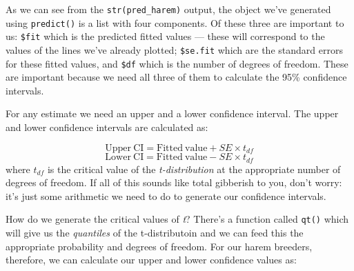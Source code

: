 \documentclass[
]{book}
\newenvironment{Shaded}{\begin{snugshade}}{\end{snugshade}}
\newcommand{\CommentTok}[1]{\textcolor[rgb]{0.56,0.35,0.01}{\textit{#1}}}
\newcommand{\DataTypeTok}[1]{\textcolor[rgb]{0.13,0.29,0.53}{#1}}
\newcommand{\FloatTok}[1]{\textcolor[rgb]{0.00,0.00,0.81}{#1}}
\newcommand{\KeywordTok}[1]{\textcolor[rgb]{0.13,0.29,0.53}{\textbf{#1}}}
\newcommand{\NormalTok}[1]{#1}
\newcommand{\OperatorTok}[1]{\textcolor[rgb]{0.81,0.36,0.00}{\textbf{#1}}}
\newcommand{\StringTok}[1]{\textcolor[rgb]{0.31,0.60,0.02}{#1}}
\begin{document}
As we can see from the \texttt{str(pred\_harem)} output, the object we've generated using \texttt{predict()} is a list with four components. Of these three are important to us: \texttt{\$fit} which is the predicted fitted values --- these will correspond to the values of the lines we've already plotted; \texttt{\$se.fit} which are the standard errors for these fitted values, and \texttt{\$df} which is the number of degrees of freedom. These are important because we need all three of them to calculate the 95\% confidence intervals.

For any estimate we need an upper and a lower confidence interval. The upper and lower confidence intervals are calculated as:

\[ \mathrm{Upper \: CI} = \mathrm{Fitted \: value} + SE \times t_{df} \]
\[ \mathrm{Lower \: CI} = \mathrm{Fitted \: value} - SE \times t_{df} \]
where \(t_{df}\) is the critical value of the \emph{t-distribution} at the appropriate number of degrees of freedom. If all of this sounds like total gibberish to you, don't worry: it's just some arithmetic we need to do to generate our confidence intervals.

How do we generate the critical values of \emph{t}? There's a function called \texttt{qt()} which will give us the \emph{quantiles} of the t-distributoin and we can feed this the appropriate probability and degrees of freedom. For our harem breeders, therefore, we can calculate our upper and lower confidence values as:

\begin{Shaded}
\end{Shaded}
\end{document}
